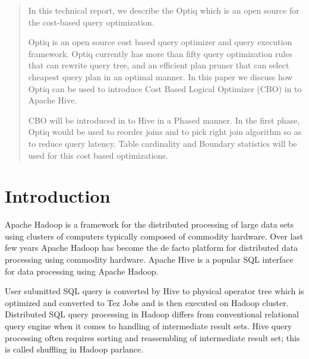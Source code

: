 \documentclass{vldb}
\begin{document}


\maketitle

\begin{abstract}
In this technical report, we describe the Optiq which is an open source for the cost-based query optimization.

Optiq is an open source cost based query optimizer and query execution framework. Optiq currently has more than fifty query optimization rules that can rewrite query tree, and an efficient plan pruner that can select cheapest query plan in an optimal manner. In this paper we discuss how Optiq can be used to introduce Cost Based Logical Optimizer (CBO) in to Apache Hive.

CBO will be introduced in to Hive in a Phased manner. In the first phase, Optiq would be used to reorder joins and to pick right join algorithm so as to reduce query latency. Table cardinality and Boundary statistics will be used for this cost based optimizations.
\end{abstract}


\section{Introduction}
Apache Hadoop is a framework for the distributed processing of large data sets using clusters of computers typically composed of commodity hardware. Over last few years Apache Hadoop has become the de facto platform for distributed data processing using commodity hardware. Apache Hive is a popular SQL interface for data processing using Apache Hadoop.

User submitted SQL query is converted by Hive to physical operator tree which is optimized and converted to Tez Jobs and is then executed on Hadoop cluster. Distributed SQL query processing in Hadoop differs from conventional relational query engine when it comes to handling of intermediate result sets. Hive query processing often requires sorting and reassembling of intermediate result set; this is called shuffling in Hadoop parlance.
\end{document}
